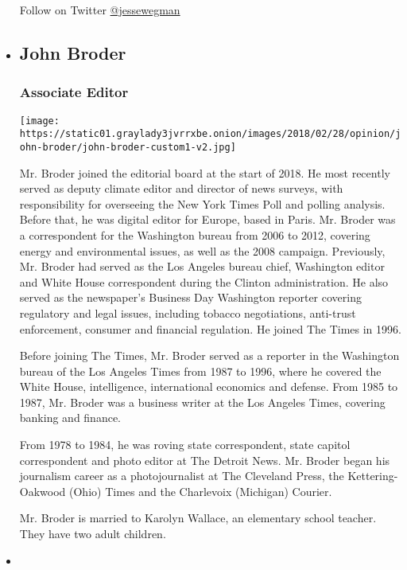 \begin{itemize}
  Follow on Twitter \href{http://twitter.com/jessewegman}{@jessewegman}
\item
  \hypertarget{john-broder}{%
  \subsection{John Broder}\label{john-broder}}

  \hypertarget{associate-editor}{%
  \subsubsection{Associate Editor}\label{associate-editor}}

  \texttt{[image: https://static01.graylady3jvrrxbe.onion/images/2018/02/28/opinion/john-broder/john-broder-custom1-v2.jpg]}

  Mr. Broder joined the editorial board at the start of 2018. He most
  recently served as deputy climate editor and director of news surveys,
  with responsibility for overseeing the New York Times Poll and polling
  analysis. Before that, he was digital editor for Europe, based in
  Paris. Mr. Broder was a correspondent for the Washington bureau from
  2006 to 2012, covering energy and environmental issues, as well as the
  2008 campaign. Previously, Mr. Broder had served as the Los Angeles
  bureau chief, Washington editor and White House correspondent during
  the Clinton administration. He also served as the newspaper's Business
  Day Washington reporter covering regulatory and legal issues,
  including tobacco negotiations, anti-trust enforcement, consumer and
  financial regulation. He joined The Times in 1996.

  Before joining The Times, Mr. Broder served as a reporter in the
  Washington bureau of the Los Angeles Times from 1987 to 1996, where he
  covered the White House, intelligence, international economics and
  defense. From 1985 to 1987, Mr. Broder was a business writer at the
  Los Angeles Times, covering banking and finance.

  From 1978 to 1984, he was roving state correspondent, state capitol
  correspondent and photo editor at The Detroit News. Mr. Broder began
  his journalism career as a photojournalist at The Cleveland Press, the
  Kettering-Oakwood (Ohio) Times and the Charlevoix (Michigan) Courier.

  Mr. Broder is married to Karolyn Wallace, an elementary school
  teacher. They have two adult children.
\item
  \hypertarget{nick-fox}{%
}
\end{itemize}
